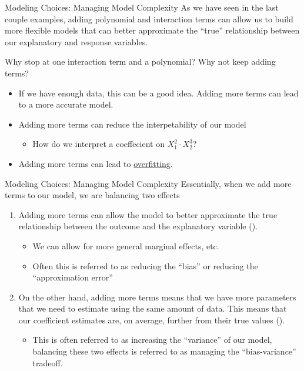 \documentclass[notheorems,9pt, handout]{beamer}
\begin{document}
\begin{frame}{Modeling Choices: Managing Model Complexity} 
	\label{frame:interaction4}
	As we have seen in the last couple examples, adding polynomial and interaction terms can allow us to build more flexible models that can better approximate the ``true'' relationship between our explanatory and response variables. 

	 Why stop at one interaction term and a polynomial? Why not keep adding terms?
	\begin{itemize}
		\item<2-> If we have enough data, this can be a good idea. Adding more terms can lead to a more accurate model. 
		\item<3-> Adding more terms can reduce the interpetability of our model
		\begin{itemize}
			\item How do we interpret a coeffecient on \(X_1^2\cdot X_2^3\)?
		\end{itemize}
		\item<4-> Adding more terms can lead to \underline{overfitting}.
	\end{itemize}
\end{frame}
\begin{frame}{Modeling Choices: Managing Model Complexity} 
	\label{frame:overfitting1}
	Essentially, when we add more terms to our model, we are balancing two effects
	\begin{enumerate}
		\item Adding more terms can allow the model to better approximate the true relationship between the outcome and the explanatory variable ().
		\begin{itemize}
			\item We can allow for more general marginal effects, etc.
			\item Often this is referred to as reducing the ``bias'' or reducing the ``approximation error''
		\end{itemize}
		\item On the other hand, adding more terms means that we have more parameters that we need to estimate using the same amount of data. This means that our coefficient estimates are, on average, further from their true values ().
		\begin{itemize}
			\item This is often referred to as increasing the ``variance'' of our model, balancing these two effects is referred to as managing the ``bias-variance'' tradeoff.
		\end{itemize}
	\end{enumerate}
\end{frame}
\end{document}
